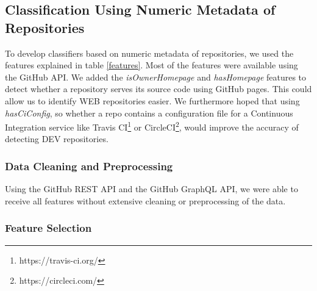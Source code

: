 \documentclass[%
a4paper,
DIV12,
2.5headlines,
bigheadings,
titlepage,
openbib,
]{scrartcl}
\begin{document}
\subsection{Classification Using Numeric Metadata of
Repositories}\label{classification-using-numeric-metadata-of-repositories}

To develop classifiers based on numeric metadata of repositories, we used the features explained in table \ref{features}.
Most of the features were available using the GitHub API.
We added the \textit{isOwnerHomepage} and \textit{hasHomepage} features to detect whether a repository serves its source code using GitHub pages.
This could allow us to identify WEB repositories easier.
We furthermore hoped that using \textit{hasCiConfig}, so whether a repo contains a configuration file for a Continuous Integration service like Travis CI\footnote{https://travis-ci.org/} or CircleCI\footnote{https://circleci.com/}, would improve the accuracy of detecting DEV repositories.

\subsubsection{Data Cleaning and
Preprocessing}\label{data-cleaning-and-preprocessing}

Using the GitHub REST API and the GitHub GraphQL API, we were able to receive all features without extensive cleaning or preprocessing of the data.

\subsubsection{Feature Selection}\label{feature-selection}
\end{document}
